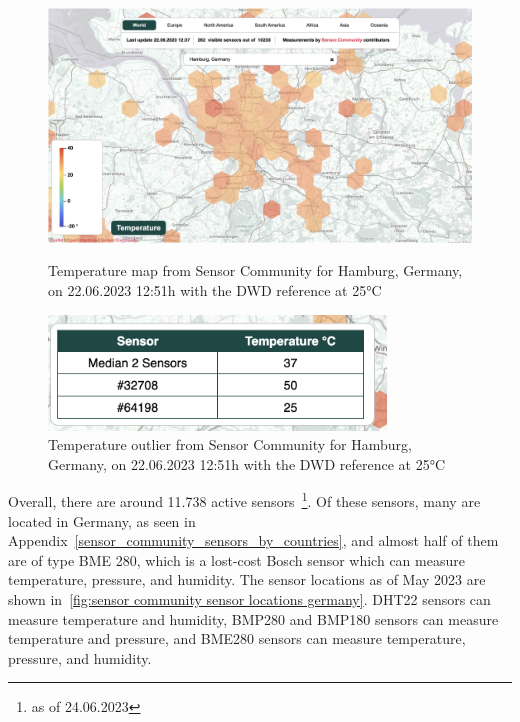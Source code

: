 \begin{figure}[ht]
    \centering
    \includegraphics[width=1\textwidth]{images/sensor_community_temperature_map.png}
    \caption{Temperature map from Sensor Community for Hamburg, Germany, on 22.06.2023 12:51h with the DWD reference at 25°C}
    \label{fig:temperature_sensor_community_map}

    \includegraphics[width=0.8\textwidth]{images/sensor_community_outliers.png}
    \caption{Temperature outlier from Sensor Community for Hamburg, Germany, on 22.06.2023 12:51h with the DWD reference at 25°C}
    \label{fig:temperature_sensor_community_outlier}
\end{figure}

Overall, there are around 11.738 active sensors~\footnote{as of 24.06.2023}. Of these sensors, many are located in Germany, as seen in Appendix~\ref{sensor_community_sensors_by_countries}, and almost half of them are of type BME 280, which is a lost-cost Bosch sensor which can measure temperature, pressure, and humidity. The sensor locations as of May 2023 are shown in~\ref{fig:sensor community sensor locations germany}. DHT22 sensors can measure temperature and humidity, BMP280 and BMP180 sensors can measure temperature and pressure, and BME280 sensors can measure temperature, pressure, and humidity.\\

